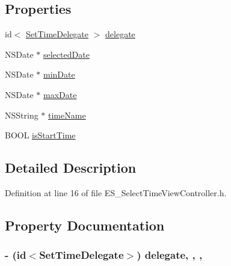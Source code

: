 \subsection*{Properties}
\begin{DoxyCompactItemize}
\item 
id$<$ \hyperlink{protocol_set_time_delegate-p}{Set\+Time\+Delegate} $>$ \hyperlink{interface_e_s___select_time_view_controller_aa43ec77eabd70bae4bc73fd351b7dd71}{delegate}
\item 
N\+S\+Date $\ast$ \hyperlink{interface_e_s___select_time_view_controller_af83b6b915cc28e012817a562119950c3}{selected\+Date}
\item 
N\+S\+Date $\ast$ \hyperlink{interface_e_s___select_time_view_controller_ab6495ea9a1a40e27e4c9f9e498298cdf}{min\+Date}
\item 
N\+S\+Date $\ast$ \hyperlink{interface_e_s___select_time_view_controller_acb1d03d3d53b964924bfd1a8c6350f3f}{max\+Date}
\item 
N\+S\+String $\ast$ \hyperlink{interface_e_s___select_time_view_controller_ae461c461e29e5155f14d4f0c88e9b907}{time\+Name}
\item 
B\+O\+O\+L \hyperlink{interface_e_s___select_time_view_controller_af9e9091dcf1cd5e3cfbb53c07d19a708}{is\+Start\+Time}
\end{DoxyCompactItemize}


\subsection{Detailed Description}


Definition at line 16 of file E\+S\+\_\+\+Select\+Time\+View\+Controller.\+h.



\subsection{Property Documentation}
\hypertarget{interface_e_s___select_time_view_controller_aa43ec77eabd70bae4bc73fd351b7dd71}{
\subsubsection[{delegate}]{\setlength{\rightskip}{0pt plus 5cm}-\/ (id$<${\bf Set\+Time\+Delegate}$>$) delegate\hspace{0.3cm}{\ttfamily [read]}, {\ttfamily [write]}, {\ttfamily [nonatomic]}, {\ttfamily [assign]}}}\label{interface_e_s___select_time_view_controller_aa43ec77eabd70bae4bc73fd351b7dd71}


